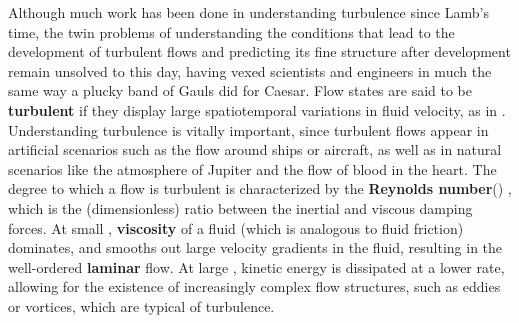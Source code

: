 Although much work has been done in understanding turbulence since Lamb's time, the twin problems of understanding the conditions that lead to the development of turbulent flows and predicting its fine structure after development remain unsolved to this day, having vexed scientists and engineers in much the same way a plucky band of Gauls did for Caesar. Flow states are said to be {\bf turbulent} if they display large spatiotemporal variations in fluid velocity, as in . Understanding turbulence is vitally important, since turbulent flows appear in artificial scenarios such as the flow around ships or aircraft, as well as in natural scenarios like the atmosphere of Jupiter  and the flow of blood in the heart. The degree to which a flow is turbulent is characterized by the {\bf Reynolds number}(\ReN) , which is the (dimensionless) ratio between the inertial and viscous damping forces. At small \ReN, {\bf viscosity} of a fluid (which is analogous to fluid friction) dominates, and smooths out large velocity gradients in the fluid, resulting in the well-ordered {\bf laminar} flow. At large \ReN, kinetic energy is dissipated at a lower rate, allowing for the existence of increasingly complex flow structures, such as eddies or vortices, which are typical of turbulence.

